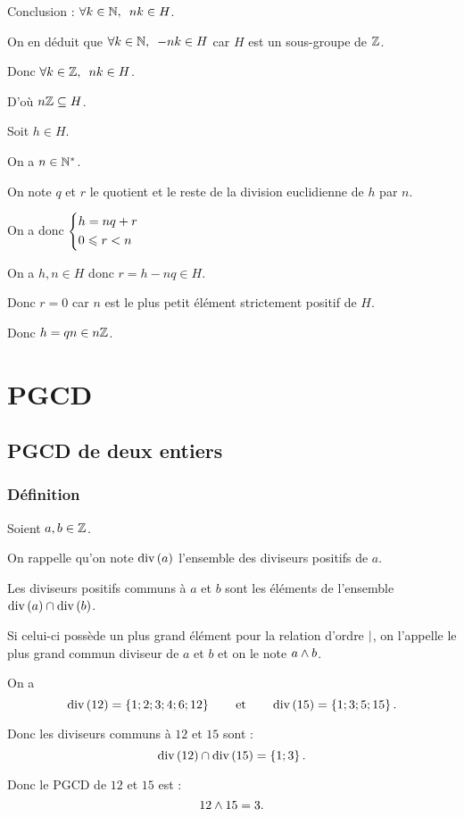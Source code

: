 \begin{dem}
Conclusion : \(\quantifs{\forall k\in\N}nk\in H\).

On en déduit que \(\quantifs{\forall k\in\N}-nk\in H\) car \(H\) est un sous-groupe de \(\Z\).

Donc \(\quantifs{\forall k\in\Z}nk\in H\).

D'où \(n\Z\subset H\).

\incdir

Soit \(h\in H\).

On a \(n\in\Ns\).

On note \(q\) et \(r\) le quotient et le reste de la division euclidienne de \(h\) par \(n\).

On a donc \(\begin{dcases}h=nq+r \\ 0\leq r<n\end{dcases}\)

On a \(h,n\in H\) donc \(r=h-nq\in H\).

Donc \(r=0\) car \(n\) est le plus petit élément strictement positif de \(H\).

Donc \(h=qn\in n\Z\).
\end{dem}

\section{PGCD}

\subsection{PGCD de deux entiers}

\subsubsection{Définition}

\begin{defi}
Soient \(a,b\in\Z\).

On rappelle qu'on note \(\ensdiv{a}\) l'ensemble des diviseurs positifs de \(a\).

Les diviseurs positifs communs à \(a\) et \(b\) sont les éléments de l'ensemble \(\ensdiv{a}\inter\ensdiv{b}\).

Si celui-ci possède un plus grand élément pour la relation d'ordre \(\divise\), on l'appelle le plus grand commun diviseur de \(a\) et \(b\) et on le note \(a\et b\).
\end{defi}

\begin{ex}
On a \[\ensdiv{12}=\accol{1;2;3;4;6;12}\qquad\text{et}\qquad\ensdiv{15}=\accol{1;3;5;15}.\]

Donc les diviseurs communs à \(12\) et \(15\) sont : \[\ensdiv{12}\inter\ensdiv{15}=\accol{1;3}.\]

Donc le PGCD de \(12\) et \(15\) est : \[12\et15=3.\]
\end{ex}

